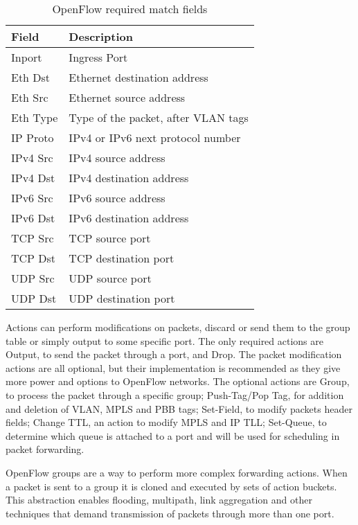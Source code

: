 \begin{table}[h!]
\caption{OpenFlow required match fields}\label{tab:OFRequired}
\centering
\begin{tabular}{|l|l|}
\hline
\textbf{Field} & \textbf{Description}                \\ \hline
Inport         & Ingress Port                        \\ \hline
Eth Dst        & Ethernet destination address         \\ \hline
Eth Src        & Ethernet source address              \\ \hline
Eth Type       & Type of the packet, after VLAN tags \\ \hline
IP Proto       & IPv4 or IPv6 next protocol number   \\ \hline
IPv4 Src       & IPv4 source address                 \\ \hline
IPv4 Dst       & IPv4 destination address             \\ \hline
IPv6 Src       & IPv6 source address                 \\ \hline
IPv6 Dst       & IPv6 destination address            \\ \hline
TCP Src        & TCP source port                     \\ \hline
TCP Dst        & TCP destination port                \\ \hline
UDP Src        & UDP source port                     \\ \hline
UDP Dst        & UDP destination port                \\ \hline
\end{tabular}
\label{my-label}
\end{table}

Actions can perform modifications on packets, discard or send them to the group table or simply output to some specific port. The only required actions are Output, to send the packet through a port, and Drop. The packet modification actions are all optional, but their implementation is recommended as they give more power and options to OpenFlow networks. The optional actions are Group, to process the packet through a specific group; Push-Tag/Pop Tag, for addition and deletion of VLAN, MPLS and PBB tags; Set-Field, to modify packets header fields; Change TTL, an action to modify MPLS and IP TLL; Set-Queue, to determine which queue is attached to a port and will be used for scheduling in packet forwarding.

OpenFlow groups are a way to perform more complex forwarding actions. When a packet is sent to a group it is cloned and executed by sets of action buckets. This abstraction enables flooding, multipath, link aggregation and other techniques that demand transmission of packets through more than one port. 

